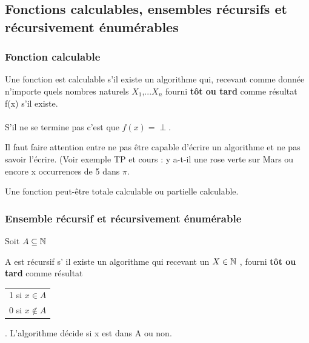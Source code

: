 \subsection{Fonctions calculables, ensembles récursifs et récursivement énumérables}
\label{sub:fonctions_calculables_ensembles_r_crusids_et_r_cursivement_num_rables}

\subsubsection{Fonction calculable}
\label{ssub:fonction_calculable}

\begin{mydef}
	Une fonction est calculable s’il existe un algorithme qui, recevant comme donnée
	n'importe quels nombres naturels $X_1$,...$X_n$ fourni \textbf{tôt ou tard} comme 
	résultat f(x) s’il existe.
\end{mydef}
	
\paragraph{} S’il ne se termine pas c'est que $f(x)=\perp$. \\

\begin{myrem}
	Il faut faire attention entre ne pas être capable d'écrire un algorithme
	et ne pas savoir l'écrire. (Voir exemple TP et cours : y a-t-il une rose 
	verte sur Mars ou encore x occurrences de 5 dans $\pi$.
\end{myrem}

\begin{myrem}
	Une fonction peut-être totale calculable ou partielle calculable.
\end{myrem}


\subsubsection{Ensemble récursif et récursivement énumérable}
\label{ssub:ensemble_r_cursif_et_r_cursivement_num_rable}
Soit $A\subseteq \mathbb{N}$

\begin{mydef}
	A est récursif s’ il existe un algorithme qui recevant un $X\in \mathbb{N}$
	, fourni \textbf{tôt ou tard} comme résultat 
	\begin{tabular}{l}
		1 si $x\in A$\\
		0 si $x\notin A$\\
	\end{tabular}
	. L'algorithme décide si x est dans A ou non.
\end{mydef}


